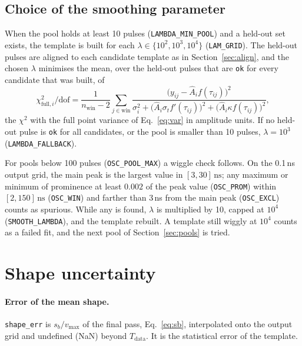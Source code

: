 \documentclass[11pt]{article}
\newcommand{\ns}{\,\mathrm{ns}}
\newcommand{\code}[1]{\texttt{#1}}
\begin{document}
\subsection{Choice of the smoothing parameter}
\label{sec:lambda}

When the pool holds at least 10 pulses (\code{LAMBDA\_MIN\_POOL}) and a held-out set exists, the template is built for each $\lambda \in \{10^2, 10^3, 10^4\}$ (\code{LAM\_GRID}). The held-out pulses are aligned to each candidate template as in Section~\ref{sec:align}, and the chosen $\lambda$ minimises the mean, over the held-out pulses that are \code{ok} for every candidate that was built, of
\begin{equation}
\chi^2_{\mathrm{full},i}/\mathrm{dof} = \frac{1}{n_{\mathrm{win}} - 2} \sum_{j \in \mathrm{win}}
\frac{\big(y_{ij} - \hat A_i f(\tau_{ij})\big)^2}{\sigma_i^2 + \big(\hat A_i \sigma_t f'(\tau_{ij})\big)^2 + \big(\hat A_i \kappa f(\tau_{ij})\big)^2},
\label{eq:chi2full}
\end{equation}
the $\chi^2$ with the full point variance of Eq.~\eqref{eq:var} in amplitude units. If no held-out pulse is \code{ok} for all candidates, or the pool is smaller than 10 pulses, $\lambda = 10^3$ (\code{LAMBDA\_FALLBACK}).

For pools below 100 pulses (\code{OSC\_POOL\_MAX}) a wiggle check follows. On the 0.1\,ns output grid, the main peak is the largest value in $[3, 30]\ns$; any maximum or minimum of prominence at least $0.002$ of the peak value (\code{OSC\_PROM}) within $[2, 150]\ns$ (\code{OSC\_WIN}) and farther than 3\,ns from the main peak (\code{OSC\_EXCL}) counts as spurious. While any is found, $\lambda$ is multiplied by 10, capped at $10^4$ (\code{SMOOTH\_LAMBDA}), and the template rebuilt. A template still wiggly at $10^4$ counts as a failed fit, and the next pool of Section~\ref{sec:pools} is tried.

\section{Shape uncertainty}
\label{sec:unc}

\paragraph{Error of the mean shape.} \code{shape\_err} is $s_b / v_{\max}$ of the final pass, Eq.~\eqref{eq:sb}, interpolated onto the output grid and undefined (NaN) beyond $T_{\mathrm{data}}$. It is the statistical error of the template.
\end{document}
